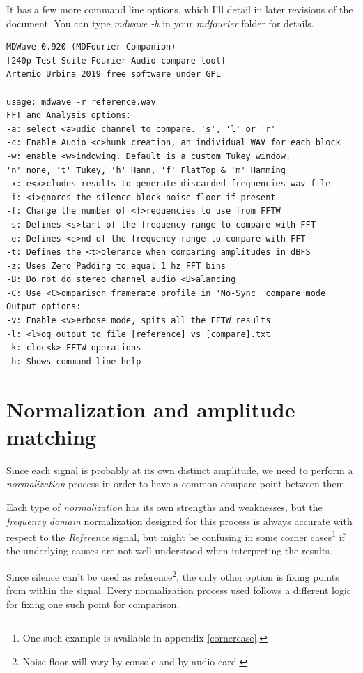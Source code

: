 \documentclass[10pt,a4paper]{report}
\begin{document}
\begin{appendices}
It has a few more command line options, which I'll detail in later revisions of the document. You can type \textit{mdwave -h} in your \textit{mdfourier} folder for details.

\begin{verbatim}
MDWave 0.920 (MDFourier Companion)
[240p Test Suite Fourier Audio compare tool]
Artemio Urbina 2019 free software under GPL

usage: mdwave -r reference.wav
FFT and Analysis options:
-a: select <a>udio channel to compare. 's', 'l' or 'r'
-c: Enable Audio <c>hunk creation, an individual WAV for each block
-w: enable <w>indowing. Default is a custom Tukey window.
'n' none, 't' Tukey, 'h' Hann, 'f' FlatTop & 'm' Hamming
-x: e<x>cludes results to generate discarded frequencies wav file
-i: <i>gnores the silence block noise floor if present
-f: Change the number of <f>requencies to use from FFTW
-s: Defines <s>tart of the frequency range to compare with FFT
-e: Defines <e>nd of the frequency range to compare with FFT
-t: Defines the <t>olerance when comparing amplitudes in dBFS
-z: Uses Zero Padding to equal 1 hz FFT bins
-B: Do not do stereo channel audio <B>alancing
-C: Use <C>omparison framerate profile in 'No-Sync' compare mode
Output options:
-v: Enable <v>erbose mode, spits all the FFTW results
-l: <l>og output to file [reference]_vs_[compare].txt
-k: cloc<k> FFTW operations
-h: Shows command line help
\end{verbatim}

\chapter{Normalization and amplitude matching}
\label{normalization}

Since each signal is probably at its own distinct amplitude, we need to perform a \textit{normalization} process in order to have a common compare point between them.

Each type of \textit{normalization} has its own strengths and weaknesses, but the \textit{frequency domain} normalization designed for this process is always accurate with respect to the \textit{Reference} signal, but might be confusing in some corner cases\footnote{One such example is available in appendix \ref{cornercase}.} if the underlying causes are not well understood when interpreting the results.

Since silence can't be used as reference\footnote{Noise floor will vary by console and by audio card.}, the only other option is fixing points from within the signal. Every normalization process used follows a different logic for fixing one such point for comparison.


\end{appendices}
\end{document}
